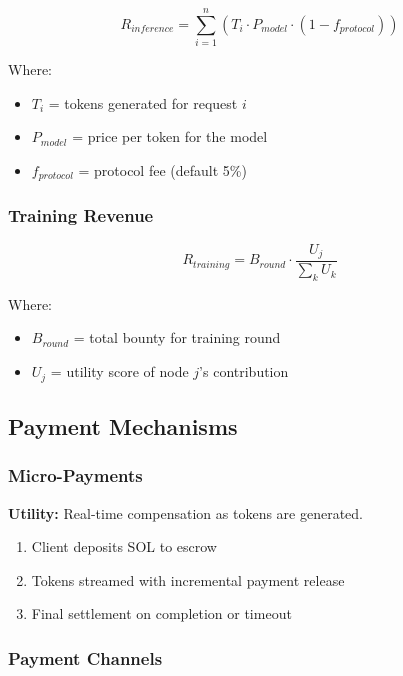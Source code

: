 \documentclass[11pt,a4paper]{article}
\begin{document}
\begin{equation}
R_{inference} = \sum_{i=1}^{n} (T_i \cdot P_{model} \cdot (1 - f_{protocol}))
\end{equation}

Where:
\begin{itemize}
    \item $T_i$ = tokens generated for request $i$
    \item $P_{model}$ = price per token for the model
    \item $f_{protocol}$ = protocol fee (default 5\%)
\end{itemize}

\subsubsection{Training Revenue}

\begin{equation}
R_{training} = B_{round} \cdot \frac{U_j}{\sum_{k} U_k}
\end{equation}

Where:
\begin{itemize}
    \item $B_{round}$ = total bounty for training round
    \item $U_j$ = utility score of node $j$'s contribution
\end{itemize}

\subsection{Payment Mechanisms}

\subsubsection{Micro-Payments}

\textbf{Utility:} Real-time compensation as tokens are generated.

\begin{enumerate}
    \item Client deposits SOL to escrow
    \item Tokens streamed with incremental payment release
    \item Final settlement on completion or timeout
\end{enumerate}

\subsubsection{Payment Channels}
\end{document}
